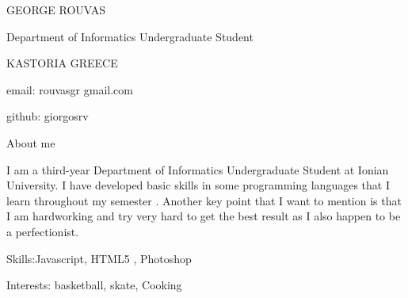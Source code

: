\documentclass[11pt]{article}
\begin{document}
                   GEORGE ROUVAS
                   
     Department of Informatics Undergraduate Student
     
     KASTORIA GREECE
     
     email: rouvasgr gmail.com
     
     github: giorgosrv
     
                   About me
                   
   I am a third-year Department of Informatics Undergraduate Student at Ionian University. I have developed basic skills in some programming languages that I learn throughout my semester . Another key point that I want to mention is that I am hardworking and try very hard to get the best result as I also happen to be a perfectionist.
  
             Skills:Javascript, HTML5 , Photoshop  
                                  
             Interests: basketball, skate, Cooking
\end{document}
